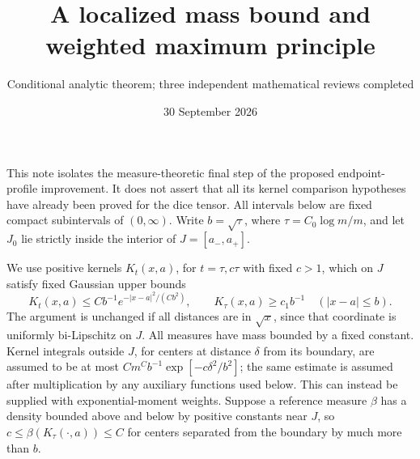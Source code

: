 \documentclass[11pt]{article}
\title{A localized mass bound and weighted maximum principle}
\author{Conditional analytic theorem; three independent mathematical reviews completed}
\date{30 September 2026}
\begin{document}
\maketitle
This note isolates the measure-theoretic final step of the proposed
endpoint-profile improvement. It does not assert that all its kernel
comparison hypotheses have already been proved for the dice tensor.
All intervals below are fixed compact subintervals of $(0,\infty)$.
Write $b=\sqrt{\tau}$, where $\tau=C_0\log m/m$, and let $J_0$ lie
strictly inside the interior of $J=[a_-,a_+]$.

We use positive kernels $K_t(x,a)$, for $t=\tau,c\tau$ with fixed $c>1$,
which on $J$ satisfy fixed Gaussian upper bounds
\[
 K_t(x,a)\le Cb^{-1}e^{-|x-a|^2/(Cb^2)},
 \qquad K_\tau(x,a)\ge c_1b^{-1}\quad (|x-a|\le b).
\]
The argument is unchanged if all distances are in $\sqrt{x}$, since
that coordinate is uniformly bi-Lipschitz on $J$.
All measures have mass bounded by a fixed constant. Kernel integrals
outside $J$, for centers at distance $\delta$ from its boundary, are
assumed to be at most
$C m^C b^{-1}\exp[-c\delta^2/b^2]$; the same estimate is assumed after
multiplication by any auxiliary functions used below. This can instead
be supplied with exponential-moment weights.
Suppose a reference measure $\beta$ has a density bounded above and
below by positive constants near $J$, so
$c\le\beta(K_\tau(\cdot,a))\le C$ for centers separated from the
boundary by much more than $b$.
\end{document}
